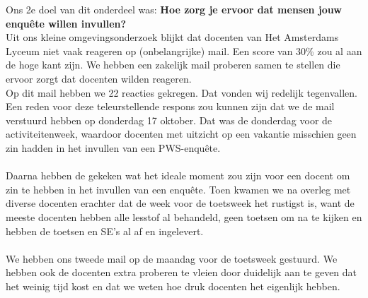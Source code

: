 \documentclass[12pt]{article}
\begin{document}
\begin{multicols}{2}
Ons 2e doel van dit onderdeel was: \textbf{Hoe zorg je ervoor dat mensen jouw enquête willen invullen?}\\
Uit ons kleine omgevingsonderzoek blijkt dat docenten van Het Amsterdams Lyceum niet vaak reageren op (onbelangrijke) mail. Een score van 30\% zou al aan de hoge kant zijn. We hebben een zakelijk mail proberen samen te stellen die ervoor zorgt dat docenten wilden reageren. \\
Op dit mail hebben we 22 reacties gekregen. Dat vonden wij redelijk tegenvallen.
Een reden voor deze teleurstellende respons zou kunnen zijn dat we de mail verstuurd hebben op donderdag 17 oktober. Dat was de donderdag voor de activiteitenweek, waardoor docenten met uitzicht op een vakantie misschien geen zin hadden in het invullen van een PWS-enquête.\\
\\
Daarna hebben de gekeken wat het ideale moment zou zijn voor een docent om zin te hebben in het invullen van een enquête. Toen kwamen we na overleg met diverse docenten erachter dat de week voor de toetsweek het rustigst is, want de meeste docenten hebben alle lesstof al behandeld, geen toetsen om na te kijken en hebben de toetsen en SE's al af en ingelevert.  \\
\\
We hebben ons tweede mail op de maandag voor de toetsweek gestuurd. We hebben ook de docenten extra proberen te vleien door duidelijk aan te geven dat het weinig tijd kost en dat we weten hoe druk docenten het eigenlijk hebben.
\fbox{\begin{minipage}{\linewidth}
    

\end{minipage}}
\end{multicols}
\end{document}
